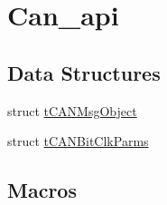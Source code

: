 \hypertarget{group__can__api}{}\section{Can\+\_\+api}
\label{group__can__api}
\subsection*{Data Structures}
\begin{DoxyCompactItemize}
\item 
struct \hyperlink{structtCANMsgObject}{t\+C\+A\+N\+Msg\+Object}
\item 
struct \hyperlink{structtCANBitClkParms}{t\+C\+A\+N\+Bit\+Clk\+Parms}
\end{DoxyCompactItemize}
\subsection*{Macros}
